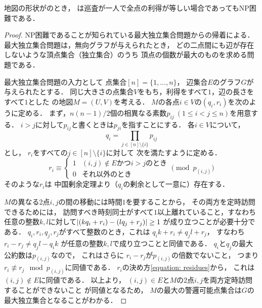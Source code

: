 \begin{theo}
  \label{theo:UnitExacIdletimeNPhard}
  地図の形状が{\graphUnit}のとき，
  {\timeSpecifiedPatProb}は巡査が一人で全点の利得が等しい場合であってもNP困難である．
  \end{theo}
\begin{proof}
  NP困難であることが知られている最大独立集合問題からの帰着による．
  最大独立集合問題は，無向グラフが与えられたとき，
  どの二点間にも辺が存在しないような頂点集合（独立集合）のうち
  頂点の個数が最大のものを求める問題である．

  \newcommand{\primenum}[2]{p_{{#1}{#2}}}
  最大独立集合問題の入力として
  点集合$[n] = \{1, \ldots, n\}$，
  辺集合$E$のグラフ$G$が与えられたとする．
  同じ大きさの点集合$V$をもち，利得をすべて$1$，辺の長さをすべて$1$とした
  {\graphUnit}の地図$M = (U, V)$を考える．
  $M$の各点$i \in V$の{\exactTime}$(q_i, r_i)$を次のように定める．
  まず，$n(n - 1)/2$個の相異なる素数$\primenum{i}{j}\ (1 \leq i < j \leq n)$を用意する．
  $i > j$に対して$\primenum{i}{j}$と書くときは$\primenum{j}{i}$を指すことにする．
  各$i \in V$について，
  \begin{equation}
    q_i = \prod_{j \in [n] \setminus \{i\}} \primenum{i}{j}
  \end{equation}
  とし，
  $r _i$をすべての$j \in [n] \setminus \{i\}$に対して
  次を満たすように定める．
  \begin{equation}
    \label{equation: residues}
    r _i
    \equiv
    \begin{cases}
      1 & \text{$(i, j) \notin E$かつ$i > j$のとき} \\
      0 & \text{それ以外のとき}
    \end{cases}
    \pmod{p _{(i, j)}}
  \end{equation}
  そのような$r _i$は
  中国剰余定理より（$q _i$の剰余として一意に）存在する．

  $M$の異なる2点$i, j$の間の移動には時間$1$を要することから，
  その両方を定時訪問できるためには，
  訪問すべき時刻同士がすべて$1$以上離れていること，すなわち
  任意の整数$k, l$に対して$\lvert{(k q_i + r_i) - (l q_j + r_j)}\rvert \geq 1$%
  が成り立つことが必要十分である．
  $q_i, r_i, q_j, r_j$がすべて整数のとき，これは
  $q_i k + r_i \neq q_j l + r_j$，
  すなわち
  $r_i - r_j \neq q_j l - q_i k$%
  が任意の整数$k, l$で成り立つことと同値である．
  $q _i$と$q _j$の最大公約数は$p _{(i, j)}$なので，
  これはさらに
  $r_i - r_j$が$p _{(i, j)}$の倍数でないこと，
  つまり$r_i \not\equiv r_j \mod p _{(i, j)}$に同値である．
  $r_i$の決め方\eqref{equation: residues}から，
  これは$(i, j) \notin E$に同値である．
  以上より，
  $(i, j) \in E$と$M$の2点$i, j$を両方定時訪問することができないこと
  が同値となるため，
  $M$の最大の警邏可能点集合は$G$の最大独立集合となることがわかる．


\end{proof}
